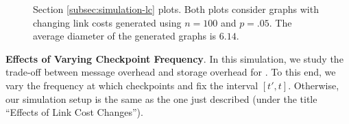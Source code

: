 \begin{figure}[t]
\centering
{}
\caption{Section \ref{subsec:simulation-lc} plots.  Both plots consider \er graphs with changing link costs generated using $n=100$ and $p=.05$.
The average diameter of the generated graphs is $6.14$.}
\label{fig:rollback-lc}
\end{figure} 




{\bf Effects of Varying Checkpoint Frequency}.
In this simulation, we study the trade-off between message overhead and storage overhead for \cprs. To this end, we vary the frequency at which \cpr checkpoints and fix 
the interval $[t',t]$. Otherwise, our simulation setup is the same as the one just described (under the title ``Effects of Link Cost Changes''). %

